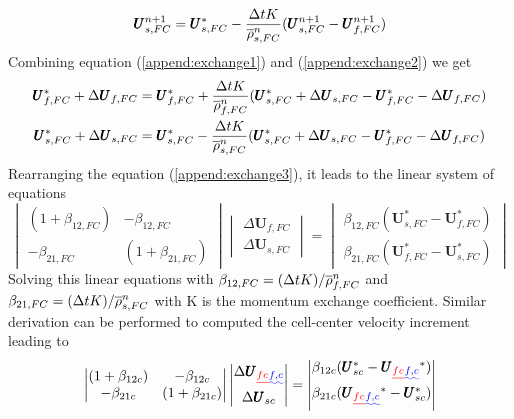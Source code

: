 \documentclass[preprint,12pt]{elsarticle}
\providecommand{\DIFadd}[1]{{\protect\color{blue}\uwave{#1}}} %
\providecommand{\DIFdel}[1]{{\protect\color{red}\sout{#1}}}                      %
\providecommand{\DIFaddbegin}{} %
\providecommand{\DIFaddend}{} %
\providecommand{\DIFdelbegin}{} %
\providecommand{\DIFdelend}{} %
\newcommand{\DIFscaledelfig}{0.5}
\newlength{\DIFdelgraphicswidth} %
\newlength{\DIFdelgraphicsheight} %
\newcommand{\DIFaddincludegraphics}[2][]{{\color{blue}\fbox{\DIFOincludegraphics[#1]{#2}}}} %
\newcommand{\DIFdelincludegraphics}[2][]{%
\sbox{\DIFdelgraphicsbox}{\DIFOincludegraphics[#1]{#2}}%
\settoboxwidth{\DIFdelgraphicswidth}{\DIFdelgraphicsbox} %
\settoboxtotalheight{\DIFdelgraphicsheight}{\DIFdelgraphicsbox} %
\scalebox{\DIFscaledelfig}{%
\parbox[b]{\DIFdelgraphicswidth}{\usebox{\DIFdelgraphicsbox}\\[-\baselineskip] \rule{\DIFdelgraphicswidth}{0em}}\llap{\resizebox{\DIFdelgraphicswidth}{\DIFdelgraphicsheight}{%
\setlength{\unitlength}{\DIFdelgraphicswidth}%
\begin{picture}(1,1)%
\thicklines\linethickness{2pt} %
{\color[rgb]{1,0,0}\put(0,0){\framebox(1,1){}}}%
{\color[rgb]{1,0,0}\put(0,0){\line( 1,1){1}}}%
{\color[rgb]{1,0,0}\put(0,1){\line(1,-1){1}}}%
\end{picture}%
}\hspace*{3pt}}} %
} %
\DeclareRobustCommand{\DIFaddbegin}{\DIFOaddbegin \let\includegraphics\DIFaddincludegraphics} %
\DeclareRobustCommand{\DIFaddend}{\DIFOaddend \let\includegraphics\DIFOincludegraphics} %
\DeclareRobustCommand{\DIFdelbegin}{\DIFOdelbegin \let\includegraphics\DIFdelincludegraphics} %
\DeclareRobustCommand{\DIFdelend}{\DIFOaddend \let\includegraphics\DIFOincludegraphics} %
\begin{document}
\begin{equation}
\label{append:exchange2}
  \pmb{U}_{s,FC}^{n+1} =  \pmb{U}_{s,FC}^{*} -  \frac{\Delta{t} K}{\overline{\rho}_{s,FC}^n} (\pmb{U}_{s,FC}^{n+1} - \pmb{U}_{f,FC}^{n+1})
\end {equation}
%
%
Combining equation (\ref{append:exchange1}) and (\ref{append:exchange2}) we get\DIFaddbegin \DIFadd{:
}\DIFaddend %
\begin{equation}
\begin{gathered}
\label{append:exchange3}
  \pmb{U}_{f,FC}^{*} + \Delta \pmb{U}_{f,FC} =  \pmb{U}_{f,FC}^{*} +  \frac{\Delta{t} K}{\overline{\rho}_{f,FC}^n} (\pmb{U}_{s,FC}^{*} + \Delta \pmb{U}_{s,FC} - \pmb{U}_{f,FC}^{*} - \Delta \pmb{U}_{f,FC}) \\
  \pmb{U}_{s,FC}^{*} + \Delta \pmb{U}_{s,FC} =  \pmb{U}_{s,FC}^{*} -  \frac{\Delta{t} K}{\overline{\rho}_{s,FC}^n} (\pmb{U}_{s,FC}^{*} + \Delta \pmb{U}_{s,FC} - \pmb{U}_{f,FC}^{*} - \Delta \pmb{U}_{f,FC})
\end {gathered}
\end {equation}
%
%
Rearranging the equation (\ref{append:exchange3}), it leads to the linear system of equations \DIFaddbegin \DIFadd{as belows:
}\DIFaddend %
\[ \begin{vmatrix} (1 + \beta_{12,FC})  &  -\beta_{12,FC} \\
                  -\beta_{21,FC}       &  (1 + \beta_{21,FC})
    \end {vmatrix}
    \begin{vmatrix} \Delta \pmb{U}_{f,FC} \\
                    \Delta \pmb{U}_{s,FC}
    \end {vmatrix}
    =
    \begin{vmatrix}  \beta_{12,FC}(\pmb{U}_{s,FC}^{*} - \pmb{U}_{f,FC}^{*}) \\
                    \beta_{21,FC}(\pmb{U}_{f,FC}^{*} - \pmb{U}_{s,FC}^{*})
    \end {vmatrix}                
\]
%
%
Solving this linear equations with $\beta_{12,FC} = (\Delta{t} K)/\overline{\rho}_{f,FC}^n$ and $\beta_{21,FC} = (\Delta{t} K)/\overline{\rho}_{s,FC}^n$ with K is the momentum exchange coefficient. Similar derivation can be performed to computed the cell-center velocity increment leading to\DIFaddbegin \DIFadd{:
}\DIFaddend %
\[ \begin{vmatrix} (1 + \beta_{12c})  &  -\beta_{12c} \\
                  -\beta_{21c}       &  (1 + \beta_{21c})
    \end {vmatrix}
    \begin{vmatrix} \Delta \pmb{U}\DIFdelbegin \DIFdel{_{fc} }\DIFdelend \DIFaddbegin \DIFadd{_{f,c} }\DIFaddend \\
                    \Delta \pmb{U}_{sc}
    \end {vmatrix}
    =
    \begin{vmatrix}  \beta_{12c}(\pmb{U}_{sc}^{*} - \pmb{U}\DIFdelbegin \DIFdel{_{fc}}\DIFdelend \DIFaddbegin \DIFadd{_{f,c}}\DIFaddend ^{*}) \\
                    \beta_{21c}(\pmb{U}\DIFdelbegin \DIFdel{_{fc}}\DIFdelend \DIFaddbegin \DIFadd{_{f,c}}\DIFaddend ^{*} - \pmb{U}_{sc}^{*})
    \end {vmatrix}                
\]
\end{document}

